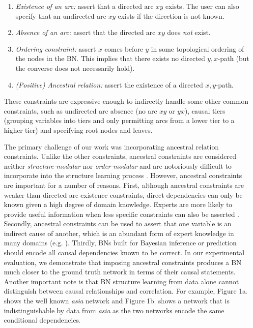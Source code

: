 \documentclass[twoside,11pt]{article}
\begin{document}
\begin{enumerate}[label=({\arabic*})]
	\item \emph{Existence of an arc:} assert that a directed arc $xy$ exists. The user can also specify that an undirected arc $xy$ exists if the direction is not known.
	
	\item \emph{Absence of an arc:} assert that the directed arc $xy$ does \emph{not} exist. 
	
	\item \emph{Ordering constraint:} assert $x$ comes before $y$ in some topological ordering of the nodes in the BN. This implies that there exists no directed $y, x$-path (but the converse does not necessarily hold).
	
	\item \emph{(Positive) Ancestral relation:} assert the existence of a directed $x, y$-path. 

\end{enumerate}

These constraints are expressive enough to indirectly handle some other common constraints, such as undirected arc absence (no arc $xy$ or $yx$),
causal tiers (grouping variables into tiers and only permitting arcs from a lower tier to a higher tier) and specifying root nodes and leaves.

\medskip

The primary challenge of our work was incorporating ancestral relation constraints. Unlike the other constraints, ancestral constraints
are considered neither \emph{structure-modular} nor \emph{order-modular} and are notoriously difficult to incorporate into the
structure learning process \citep{Chen2016}. However, ancestral constraints are important for a number of reasons. First, although ancestral
constraints are weaker than directed arc existence constraints, direct dependencies can only be known given a high degree of 
domain knowledge. Experts are more likely to provide useful information when less specific constraints can also be asserted \citep{Flores2011}.
Secondly, ancestral constraints can be used to assert that one variable is an indirect cause of another, which is an abundant form of expert
knowledge in many domains (e.g. \cite{Sahin2006, Ma2017, Leu2013, Chen2014, Giordano2013}). Thirdly, BNs built for Bayesian inference
or prediction should encode all causal dependencies known to be correct. In our experimental evaluation, we demonstrate that imposing ancestral
constraints produces a BN much closer to the ground truth network in terms of their causal statements. Another important note is that BN structure
learning from data alone cannot distinguish between causal relationships and correlation. For example, Figure 1a. shows the well known \emph{asia}
network and Figure 1b. shows a network that is indistinguishable by data from \emph{asia} as the two networks encode the same conditional dependencies.
\end{document}
